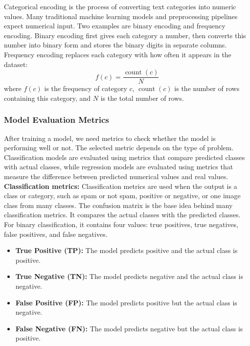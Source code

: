 \documentclass[12pt,a4paper,oneside]{report}
\begin{document}
\noindent Categorical encoding is the process of converting text categories into numeric
values. Many traditional machine learning models and preprocessing pipelines
expect numerical input. Two examples are binary encoding and frequency encoding.
Binary encoding first gives each category a number, then converts this number
into binary form and stores the binary digits in separate columns. Frequency
encoding replaces each category with how often it appears in the dataset:
\[
f(c) = \frac{\mathop{\mathrm{count}}(c)}{N}
\]
where $f(c)$ is the frequency of category $c$,
$\mathop{\mathrm{count}}(c)$ is the number of rows containing this category,
and $N$ is the total number of rows.

\subsubsection{Model Evaluation Metrics ~\cite{hossin2015review}}
After training a model, we need metrics to check whether the model is performing
well or not. The selected metric depends on the type of problem. Classification
models are evaluated using metrics that compare predicted classes with actual
classes, while regression models are evaluated using metrics that measure the
difference between predicted numerical values and real values.\\

\noindent\textbf{Classification metrics:}
Classification metrics are used when the output is a class or category, such as
spam or not spam, positive or negative, or one image class from many classes. The
confusion matrix is the base idea behind many classification metrics. It compares
the actual classes with the predicted classes. For binary classification, it
contains four values: true positives, true negatives, false positives, and false
negatives.

\begin{itemize}
  \item \textbf{True Positive (TP):} The model predicts positive and the actual
  class is positive.
  \item \textbf{True Negative (TN):} The model predicts negative and the actual
  class is negative.
  \item \textbf{False Positive (FP):} The model predicts positive but the actual
  class is negative.
  \item \textbf{False Negative (FN):} The model predicts negative but the actual
  class is positive.
\end{itemize}
\end{document}
